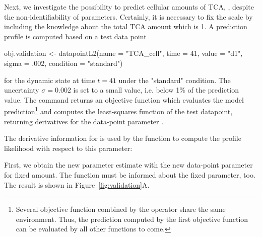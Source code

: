 \documentclass[article]{jss}
\begin{document}
Next, we investigate the possibility to predict cellular amounts of TCA, , despite the non-identifiability of parameters. Certainly, it is necessary to fix the scale by including the knowledge about the total TCA amount which is 1. A prediction profile is computed based on a test data point

\begin{CodeChunk}
\begin{CodeInput}
obj.validation <- datapointL2(name = "TCA_cell", 
			      time = 41, 
			      value = "d1", 
			      sigma = .002, 
			      condition = "standard")
\end{CodeInput}
\end{CodeChunk}

for the dynamic state  at time $t = 41$ under the "standard" condition. The uncertainty $\sigma = 0.002$ is set to a small value, i.e. below 1\% of the prediction value. The  command returns an objective function which evaluates the model prediction\footnote{Several objective function combined by the  operator share the same environment. Thus, the prediction computed by the first objective function can be evaluated by all other functions to come.} and computes the least-squares function of the test datapoint, returning derivatives for the data-point parameter .

The derivative information for  is used by the  function to compute the profile likelihood with respect to this parameter:

\begin{CodeChunk}
\end{CodeChunk}

First, we obtain the new parameter estimate  with the new data-point parameter  for fixed  amount. The  function must be informed about the fixed parameter, too. The result is shown in Figure~\ref{fig:validation}A.  
\end{document}
